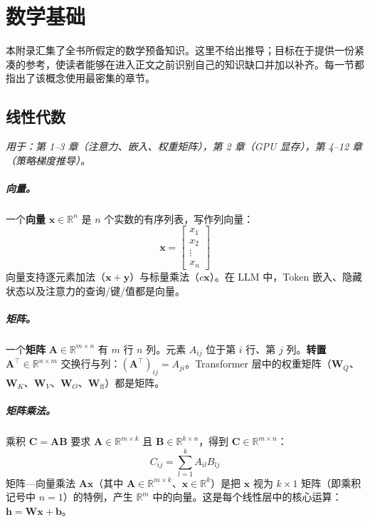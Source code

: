 \chapter{数学基础}
\label{app:math-background}

本附录汇集了全书所假定的数学预备知识。这里不给出推导；目标在于提供一份紧凑的参考，使读者能够在进入正文之前识别自己的知识缺口并加以补齐。每一节都指出了该概念使用最密集的章节。

\section{线性代数}
\label{app:linear-algebra}

\emph{用于：第 1--3 章（注意力、嵌入、权重矩阵），第 2 章（GPU 显存），第 4--12 章（策略梯度推导）。}

\paragraph{向量。}
一个\textbf{向量} $\mathbf{x} \in \mathbb{R}^n$ 是 $n$ 个实数的有序列表，写作列向量：
\[
\mathbf{x} = \begin{bmatrix} x_1 \\ x_2 \\ \vdots \\ x_n \end{bmatrix}
\]
向量支持逐元素加法（$\mathbf{x} + \mathbf{y}$）与标量乘法（$c\mathbf{x}$）。在 LLM 中，Token 嵌入、隐藏状态以及注意力的查询/键/值都是向量。

\paragraph{矩阵。}
一个\textbf{矩阵} $\mathbf{A} \in \mathbb{R}^{m \times n}$ 有 $m$ 行 $n$ 列。元素 $A_{ij}$ 位于第 $i$ 行、第 $j$ 列。\textbf{转置} $\mathbf{A}^\top \in \mathbb{R}^{n \times m}$ 交换行与列：$(\mathbf{A}^\top)_{ij} = A_{ji}$。Transformer 层中的权重矩阵（$\mathbf{W}_Q$、$\mathbf{W}_K$、$\mathbf{W}_V$、$\mathbf{W}_O$、$\mathbf{W}_{\mathrm{ff}}$）都是矩阵。

\paragraph{矩阵乘法。}
乘积 $\mathbf{C} = \mathbf{A}\mathbf{B}$ 要求 $\mathbf{A} \in \mathbb{R}^{m \times k}$ 且 $\mathbf{B} \in \mathbb{R}^{k \times n}$，得到 $\mathbf{C} \in \mathbb{R}^{m \times n}$：
\[
C_{ij} = \sum_{l=1}^{k} A_{il} B_{lj}
\]
矩阵—向量乘法 $\mathbf{A}\mathbf{x}$（其中 $\mathbf{A} \in \mathbb{R}^{m \times k}$、$\mathbf{x} \in \mathbb{R}^k$）是把 $\mathbf{x}$ 视为 $k \times 1$ 矩阵（即乘积记号中 $n=1$）的特例，产生 $\mathbb{R}^m$ 中的向量。这是每个线性层中的核心运算：$\mathbf{h} = \mathbf{W}\mathbf{x} + \mathbf{b}$。

